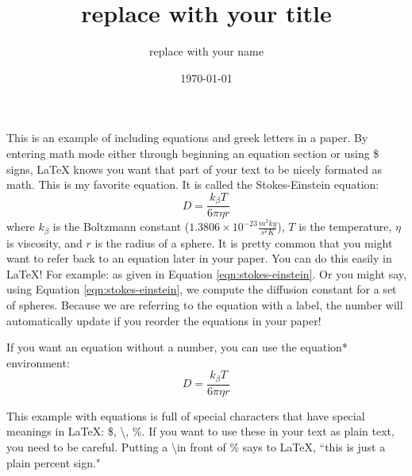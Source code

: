 \documentclass[12pt]{article}
\title{replace with your title}
\author{replace with your name}
\date{\today} %
\begin{document}
\maketitle

This is an example of including equations and greek letters in a paper. By entering math mode either through beginning an equation section or using \$ signs, LaTeX knows you want that part of your text to be nicely formated as math. This is my favorite equation. It is called the Stokes-Einstein equation:
\begin{equation}
D = \frac{k_{\beta}T}{6\pi\eta r}
\label{eqn:stokes-einstein}
\end{equation}
where $k_{\beta}$ is the Boltzmann constant ($1.3806\times10^{-23} \frac{m^2kg}{s^2K}$), $T$ is the temperature, $\eta$ is viscosity, and $r$ is the radius of a sphere. It is pretty common that you might want to refer back to an equation later in your paper. You can do this easily in LaTeX! For example: as given in Equation \eqref{eqn:stokes-einstein}.  Or you might say, using Equation \ref{eqn:stokes-einstein}, we compute the diffusion constant for a set of spheres. Because we are referring to the equation with a label, the number will automatically update if you reorder the equations in your paper!

If you want an equation without a number, you can use the equation* environment:
\begin{equation*}
D = \frac{k_{\beta}T}{6\pi\eta r}
\label{eqn:stokes-einstein_no_number}
\end{equation*}

This example with equations is full of special characters that have special meanings in LaTeX: \$, \textbackslash, \%. If you want to use these in your text as plain text, you need to be careful. Putting a \textbackslash in front of \% says to LaTeX, ``this is just a plain percent sign."
\end{document}
